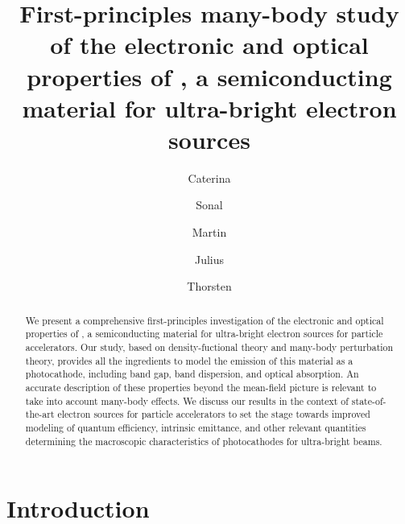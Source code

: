 \documentclass[aps,pra,superscriptaddress,twocolumn]{revtex4}
\begin{document}
\title{First-principles many-body study of the electronic and optical properties of , a semiconducting material for ultra-bright electron sources}
\author{Caterina }
%
\author{Sonal }
%
\author{Martin }
%
\author{Julius }
%
\author{Thorsten }
%
%

\begin{abstract}
We present a comprehensive first-principles investigation of the electronic and optical properties of , a semiconducting material for ultra-bright electron sources for particle accelerators. 
Our study, based on density-fuctional theory and many-body perturbation theory, provides all the ingredients to model the emission of this material as a photocathode, including band gap, band dispersion, and optical absorption.
An accurate description of these properties beyond the mean-field picture is relevant to take into account many-body effects.
We discuss our results in the context of state-of-the-art electron sources for particle accelerators to set the stage towards improved modeling of quantum efficiency, intrinsic emittance, and other relevant quantities determining the macroscopic characteristics of photocathodes for ultra-bright beams.
\end{abstract}

\maketitle
\section{Introduction}
\end{document}
